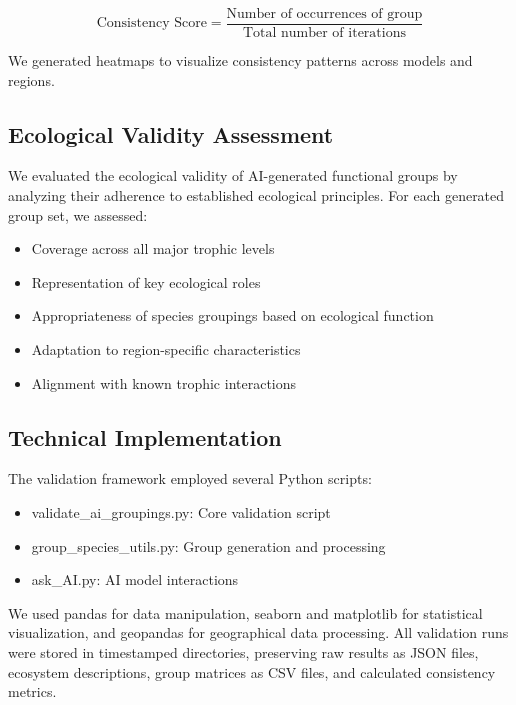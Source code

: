 \[
\text{Consistency Score} = \frac{\text{Number of occurrences of group}}{\text{Total number of iterations}}
\]

We generated heatmaps to visualize consistency patterns across models and regions.

\subsection{Ecological Validity Assessment}
We evaluated the ecological validity of AI-generated functional groups by analyzing their adherence to established ecological principles. For each generated group set, we assessed:
\begin{itemize}
    \item Coverage across all major trophic levels
    \item Representation of key ecological roles
    \item Appropriateness of species groupings based on ecological function
    \item Adaptation to region-specific characteristics
    \item Alignment with known trophic interactions
\end{itemize}

\subsection{Technical Implementation}
The validation framework employed several Python scripts:
\begin{itemize}
    \item validate\_ai\_groupings.py: Core validation script
    \item group\_species\_utils.py: Group generation and processing
    \item ask\_AI.py: AI model interactions
\end{itemize}

We used pandas for data manipulation, seaborn and matplotlib for statistical visualization, and geopandas for geographical data processing. All validation runs were stored in timestamped directories, preserving raw results as JSON files, ecosystem descriptions, group matrices as CSV files, and calculated consistency metrics.
